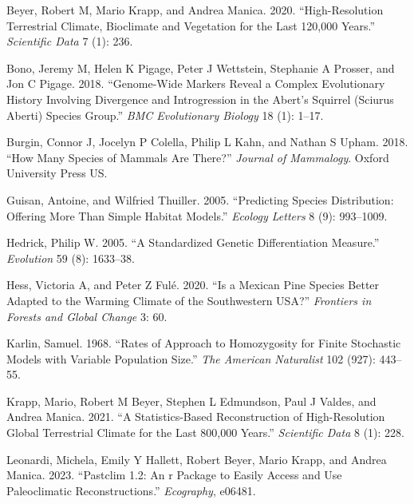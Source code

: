 \documentclass[
]{article}
\newlength{\cslhangindent}
\newlength{\cslentryspacingunit} %
\newenvironment{CSLReferences}[2] %
 {%
  \setlength{\parindent}{0pt}
  \ifodd #1
  \let\oldpar\par
  \def\par{\hangindent=\cslhangindent\oldpar}
  \fi
  \setlength{\parskip}{#2\cslentryspacingunit}
 }%
 {}
\begin{document}
\hypertarget{refs}{}
\begin{CSLReferences}{1}{0}
\leavevmode{}%
Beyer, Robert M, Mario Krapp, and Andrea Manica. 2020.
{``High-Resolution Terrestrial Climate, Bioclimate and Vegetation for
the Last 120,000 Years.''} \emph{Scientific Data} 7 (1): 236.

\leavevmode{}%
Bono, Jeremy M, Helen K Pigage, Peter J Wettstein, Stephanie A Prosser,
and Jon C Pigage. 2018. {``Genome-Wide Markers Reveal a Complex
Evolutionary History Involving Divergence and Introgression in the
Abert's Squirrel (Sciurus Aberti) Species Group.''} \emph{BMC
Evolutionary Biology} 18 (1): 1--17.

\leavevmode{}%
Burgin, Connor J, Jocelyn P Colella, Philip L Kahn, and Nathan S Upham.
2018. {``How Many Species of Mammals Are There?''} \emph{Journal of
Mammalogy}. Oxford University Press US.

\leavevmode{}%
Guisan, Antoine, and Wilfried Thuiller. 2005. {``Predicting Species
Distribution: Offering More Than Simple Habitat Models.''} \emph{Ecology
Letters} 8 (9): 993--1009.

\leavevmode{}%
Hedrick, Philip W. 2005. {``A Standardized Genetic Differentiation
Measure.''} \emph{Evolution} 59 (8): 1633--38.

\leavevmode{}%
Hess, Victoria A, and Peter Z Fulé. 2020. {``Is a Mexican Pine Species
Better Adapted to the Warming Climate of the Southwestern USA?''}
\emph{Frontiers in Forests and Global Change} 3: 60.

\leavevmode{}%
Karlin, Samuel. 1968. {``Rates of Approach to Homozygosity for Finite
Stochastic Models with Variable Population Size.''} \emph{The American
Naturalist} 102 (927): 443--55.

\leavevmode{}%
Krapp, Mario, Robert M Beyer, Stephen L Edmundson, Paul J Valdes, and
Andrea Manica. 2021. {``A Statistics-Based Reconstruction of
High-Resolution Global Terrestrial Climate for the Last 800,000
Years.''} \emph{Scientific Data} 8 (1): 228.

\leavevmode{}%
Leonardi, Michela, Emily Y Hallett, Robert Beyer, Mario Krapp, and
Andrea Manica. 2023. {``Pastclim 1.2: An r Package to Easily Access and
Use Paleoclimatic Reconstructions.''} \emph{Ecography}, e06481.


\end{CSLReferences}
\end{document}
